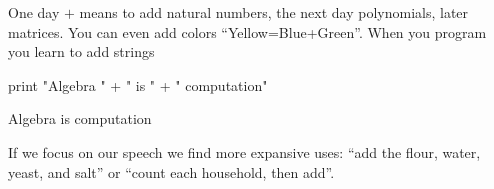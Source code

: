 


One day  $+$ means to add natural numbers, the next day 
polynomials, later matrices.  
You can even add colors ``Yellow=Blue+Green''. When you program 
you learn to add strings
\begin{center}
\begin{notebookin}
print "Algebra " + " is " + " computation"
\end{notebookin}
\begin{notebookout}
Algebra is computation
\end{notebookout}
\end{center}
If we focus on our 
speech we find more expansive uses:
``add the flour, water, yeast, and salt'' or  
``count each household, then add''.

